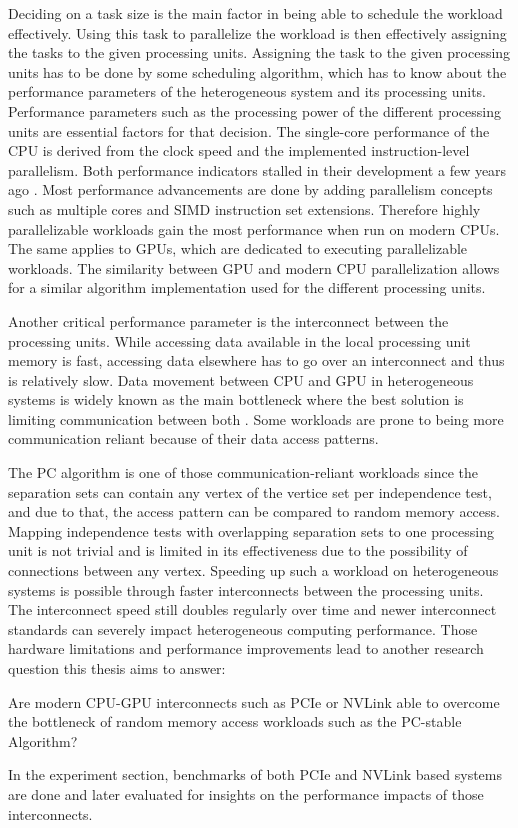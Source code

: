 Deciding on a task size is the main factor in being able to schedule the workload effectively. Using this task to parallelize the workload is then effectively assigning the tasks to the given processing units. Assigning the task to the given processing units has to be done by some scheduling algorithm, which has to know about the performance parameters of the heterogeneous system and its processing units.
Performance parameters such as the processing power of the different processing units are essential factors for that decision. The single-core performance of the CPU is derived from the clock speed and the implemented instruction-level parallelism. Both performance indicators stalled in their development a few years ago \cite{sutterFreeLunchFundamental2005}. Most performance advancements are done by adding parallelism concepts such as multiple cores and SIMD instruction set extensions. Therefore highly parallelizable workloads gain the most performance when run on modern CPUs. The same applies to GPUs, which are dedicated to executing parallelizable workloads.
The similarity between GPU and modern CPU parallelization allows for a similar algorithm implementation used for the different processing units.

Another critical performance parameter is the interconnect between the processing units. While accessing data available in the local processing unit memory is fast, accessing data elsewhere has to go over an interconnect and thus is relatively slow. Data movement between CPU and GPU in heterogeneous systems is widely known as the main bottleneck where the best solution is limiting communication between both \cite{hazarikaSurveyMemoryManagement2019}. Some workloads are prone to being more communication reliant because of their data access patterns.

The PC algorithm is one of those communication-reliant workloads since the separation sets can contain any vertex of the vertice set per independence test, and due to that, the access pattern can be compared to random memory access. Mapping independence tests with overlapping separation sets to one processing unit is not trivial and is limited in its effectiveness due to the possibility of connections between any vertex. Speeding up such a workload on heterogeneous systems is possible through faster interconnects between the processing units. The interconnect speed still doubles regularly over time \cite{NVLink2021} and newer interconnect standards can severely impact heterogeneous computing performance.
Those hardware limitations and performance improvements lead to another research question this thesis aims to answer:

Are modern CPU-GPU interconnects such as PCIe or NVLink able to overcome the bottleneck of random memory access workloads such as the PC-stable Algorithm?

In the experiment section, benchmarks of both PCIe and NVLink based systems are done and later evaluated for insights on the performance impacts of those interconnects.
